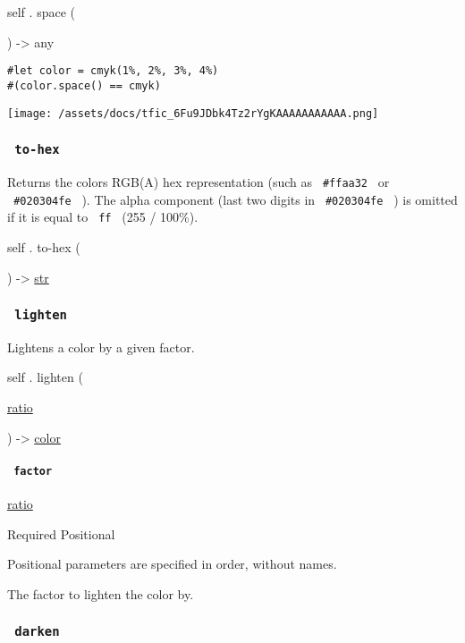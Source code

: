 self { . } { space } (

) -\textgreater{} { any }

\begin{verbatim}
#let color = cmyk(1%, 2%, 3%, 4%)
#(color.space() == cmyk)
\end{verbatim}

\texttt{[image: /assets/docs/tfic\_6Fu9JDbk4Tz2rYgKAAAAAAAAAAA.png]}

\subsubsection{\texorpdfstring{\texttt{\ to-hex\ }}{ to-hex }}\label{definitions-to-hex}

Returns the color\textquotesingle s RGB(A) hex representation (such as
\texttt{\ \#ffaa32\ } or \texttt{\ \#020304fe\ } ). The alpha component
(last two digits in \texttt{\ \#020304fe\ } ) is omitted if it is equal
to \texttt{\ ff\ } (255 / 100\%).

self { . } { to-hex } (

) -\textgreater{} \href{/docs/reference/foundations/str/}{str}

\subsubsection{\texorpdfstring{\texttt{\ lighten\ }}{ lighten }}\label{definitions-lighten}

Lightens a color by a given factor.

self { . } { lighten } (

{ \href{/docs/reference/layout/ratio/}{ratio} }

) -\textgreater{} \href{/docs/reference/visualize/color/}{color}

\paragraph{\texorpdfstring{\texttt{\ factor\ }}{ factor }}\label{definitions-lighten-factor}

\href{/docs/reference/layout/ratio/}{ratio}

{Required} {{ Positional }}

\label{definitions-lighten-factor-positional-tooltip}
Positional parameters are specified in order, without names.

The factor to lighten the color by.

\subsubsection{\texorpdfstring{\texttt{\ darken\ }}{ darken }}\label{definitions-darken}

